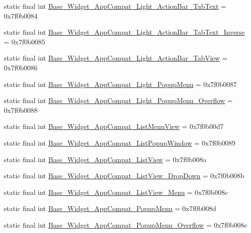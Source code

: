 \begin{CompactItemize}
\item 
static final int \hyperlink{classandroid_1_1support_1_1v4_1_1_r_1_1style_2e307565fea40362837973a3003a46f2}{Base\_\-Widget\_\-AppCompat\_\-Light\_\-ActionBar\_\-TabText} = 0x7f0b0084
\item 
static final int \hyperlink{classandroid_1_1support_1_1v4_1_1_r_1_1style_447d4a18b193fdb81924fa76e42babeb}{Base\_\-Widget\_\-AppCompat\_\-Light\_\-ActionBar\_\-TabText\_\-Inverse} = 0x7f0b0085
\item 
static final int \hyperlink{classandroid_1_1support_1_1v4_1_1_r_1_1style_6e9adc3074be585977cdb1759d378b97}{Base\_\-Widget\_\-AppCompat\_\-Light\_\-ActionBar\_\-TabView} = 0x7f0b0086
\item 
static final int \hyperlink{classandroid_1_1support_1_1v4_1_1_r_1_1style_8ab786b53c332d1efd8b4df86b28a9af}{Base\_\-Widget\_\-AppCompat\_\-Light\_\-PopupMenu} = 0x7f0b0087
\item 
static final int \hyperlink{classandroid_1_1support_1_1v4_1_1_r_1_1style_070cc9008e91883444a470844a3b327e}{Base\_\-Widget\_\-AppCompat\_\-Light\_\-PopupMenu\_\-Overflow} = 0x7f0b0088
\item 
static final int \hyperlink{classandroid_1_1support_1_1v4_1_1_r_1_1style_2ce4274e65a44156034efb089184ff45}{Base\_\-Widget\_\-AppCompat\_\-ListMenuView} = 0x7f0b00d7
\item 
static final int \hyperlink{classandroid_1_1support_1_1v4_1_1_r_1_1style_c95c196b32008967f5120504f7c84878}{Base\_\-Widget\_\-AppCompat\_\-ListPopupWindow} = 0x7f0b0089
\item 
static final int \hyperlink{classandroid_1_1support_1_1v4_1_1_r_1_1style_aff29fba1b930c5c9ae8ec1bb3927261}{Base\_\-Widget\_\-AppCompat\_\-ListView} = 0x7f0b008a
\item 
static final int \hyperlink{classandroid_1_1support_1_1v4_1_1_r_1_1style_9cbc2a0743de03c48652ce5a7c1ea3de}{Base\_\-Widget\_\-AppCompat\_\-ListView\_\-DropDown} = 0x7f0b008b
\item 
static final int \hyperlink{classandroid_1_1support_1_1v4_1_1_r_1_1style_ea989a8cbe59299a7b62132a5931d9ce}{Base\_\-Widget\_\-AppCompat\_\-ListView\_\-Menu} = 0x7f0b008c
\item 
static final int \hyperlink{classandroid_1_1support_1_1v4_1_1_r_1_1style_46b02f094b97323ce2ad970c269d6c93}{Base\_\-Widget\_\-AppCompat\_\-PopupMenu} = 0x7f0b008d
\item 
static final int \hyperlink{classandroid_1_1support_1_1v4_1_1_r_1_1style_ee7da3d731254dcc0619abb73e0ea2dc}{Base\_\-Widget\_\-AppCompat\_\-PopupMenu\_\-Overflow} = 0x7f0b008e

\end{CompactItemize}
